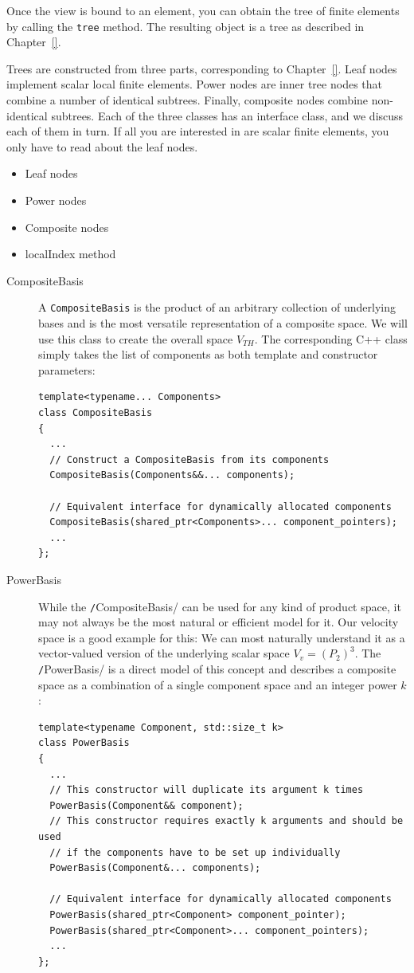 \documentclass[a4paper,10pt,headings=normal,bibliography=totoc]{scrartcl}
\newcommand{\cpp}[1]{\lstinline[basicstyle=\ttfamily]!#1!}
\begin{document}
Once the view is bound to an element, you can obtain the tree of finite elements by calling the \cpp{tree}
method.  The resulting object is a tree as described in Chapter~\ref{}.

Trees are constructed from three parts, corresponding to Chapter~\ref{}.
Leaf nodes implement scalar local finite elements.  Power nodes are inner tree nodes that combine a number
of identical subtrees.  Finally, composite nodes combine non-identical subtrees.  Each of the three classes
has an interface class, and we discuss each of them in turn.  If all you are interested in are
scalar finite elements, you only have to read about the leaf nodes.

\begin{itemize}
 \item Leaf nodes
 \item Power nodes
 \item Composite nodes
 \item localIndex method
\end{itemize}

\begin{description}
\item[CompositeBasis] A \cpp{CompositeBasis} is the product of an arbitrary collection of underlying bases and is the
most versatile representation of a composite space. We will use this class to create the overall space $V_{TH}$.
The corresponding C++ class simply takes the list of components as both template and constructor parameters:
\begin{lstlisting}
template<typename... Components>
class CompositeBasis
{
  ...
  // Construct a CompositeBasis from its components
  CompositeBasis(Components&&... components);

  // Equivalent interface for dynamically allocated components
  CompositeBasis(shared_ptr<Components>... component_pointers);
  ...
};
\end{lstlisting}
\item[PowerBasis] While the \cpp/CompositeBasis/ can be used for any kind of product space, it may not always be the most natural
or efficient model for it. Our velocity space is a good example for this: We can most naturally understand it as a vector-valued
version of the underlying scalar space $V_v = (P_2)^3$. The \cpp/PowerBasis/ is a direct model of this concept and describes
a composite space as a combination of a single component space and an integer power $k$:
  \begin{lstlisting}
template<typename Component, std::size_t k>
class PowerBasis
{
  ...
  // This constructor will duplicate its argument k times
  PowerBasis(Component&& component);
  // This constructor requires exactly k arguments and should be used
  // if the components have to be set up individually
  PowerBasis(Component&... components);

  // Equivalent interface for dynamically allocated components
  PowerBasis(shared_ptr<Component> component_pointer);
  PowerBasis(shared_ptr<Component>... component_pointers);
  ...
};
  \end{lstlisting}
\end{description}
\end{document}
